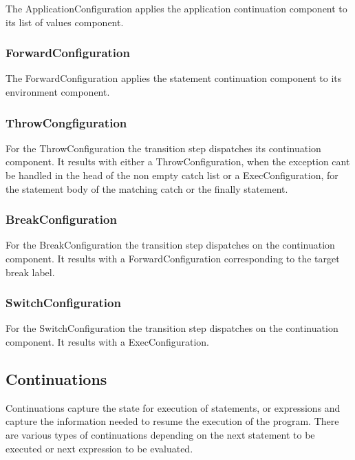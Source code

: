 \documentclass{article}
\begin{document}
The ApplicationConfiguration applies the application continuation component to its list of values component.

\subsubsection{ForwardConfiguration}
\label{subsubsec:forwardconfig}

The ForwardConfiguration applies the statement continuation component to its environment component.

\subsubsection{ThrowCongfiguration}
\label{subsubsec:throwconfig}

For the ThrowConfiguration the transition step dispatches its continuation component.  It results with either a ThrowConfiguration, when  the exception cant be handled in the head of the non empty catch list or a ExecConfiguration, for the statement body of the matching catch or the finally statement.

\subsubsection{BreakConfiguration}
\label{subsubsec:breakconfig}

For the BreakConfiguration the transition step dispatches on the continuation component. It results with a ForwardConfiguration corresponding to the target break label.

\subsubsection{SwitchConfiguration}
\label{subsubsec:switchconfig}

For the SwitchConfiguration the transition step dispatches on the continuation component. It results with a ExecConfiguration.

\subsection{Continuations}
\label{subsec:continuations-definition}

Continuations capture the state for execution of statements, or expressions and capture the information needed to resume the execution of the program.
There are various types of continuations depending on the next statement to be executed or next expression to be evaluated.
\end{document}
